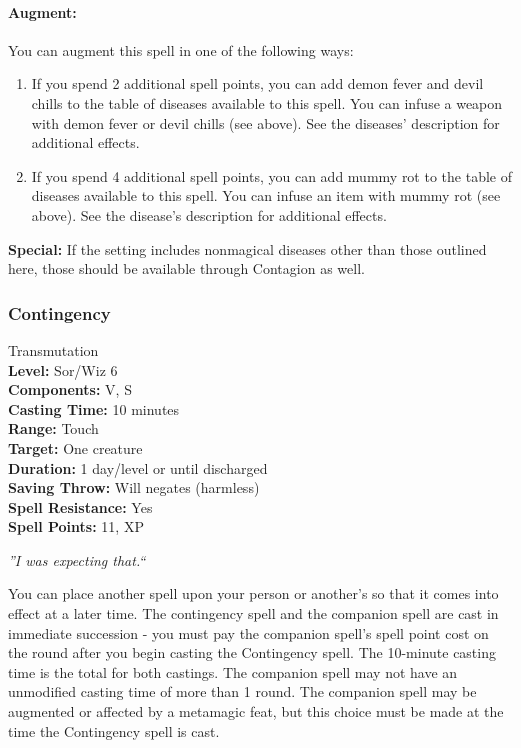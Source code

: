\paragraph{Augment:} You can augment this spell in one of the following ways:
\begin{enumerate}
 \item If you spend 2 additional spell points, you can add demon fever and devil chills
 to the table of diseases available to this spell. You can infuse a weapon with
 demon fever or devil chills (see above). 
 See the diseases' description for additional effects.
 \item If you spend 4 additional spell points, you can add mummy rot to the table of
 diseases available to this spell. You can infuse an item with mummy rot (see above).
 See the disease's description for additional effects.
\end{enumerate}

\textbf{Special:} If the setting includes nonmagical diseases other than those outlined here,
those should be available through Contagion as well.
\subsubsection{Contingency}
\label{Spell:Contingency}
Transmutation
\\ \textbf{Level:} Sor/Wiz 6
\\ \textbf{Components:} V, S
\\ \textbf{Casting Time:} 10 minutes
\\ \textbf{Range:} Touch
\\ \textbf{Target:} One creature
\\ \textbf{Duration:} 1 day/level or until discharged
\\ \textbf{Saving Throw:} Will negates (harmless)
\\ \textbf{Spell Resistance:} Yes
\\ \textbf{Spell Points:} 11, XP

\emph{''I was expecting that.``}

You can place another spell upon your person or another's so that it comes into effect at a later time.
The contingency spell and the companion spell are cast in immediate succession - you must pay the companion spell's spell point cost on the round after you begin casting the Contingency spell. 
The 10-minute casting time is the total for both castings.
The companion spell may not have an unmodified casting time of more than 1 round.
The companion spell may be augmented or affected by a metamagic feat, but this choice must be made at the time the Contingency spell is cast.


